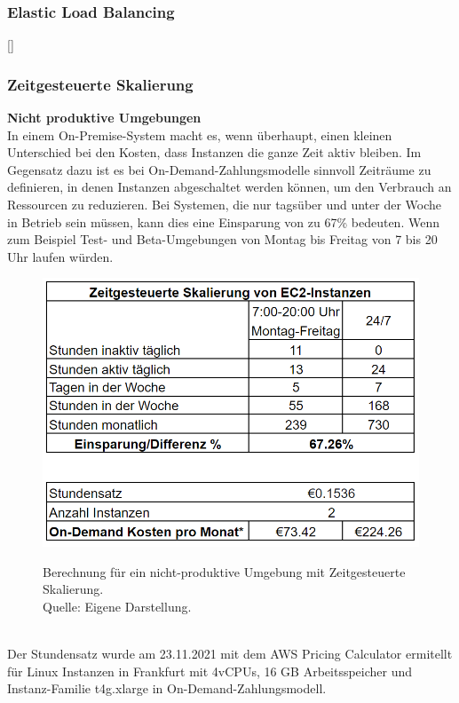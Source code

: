 \subsubsection*{Elastic Load Balancing}%
[]
\subsubsection{Zeitgesteuerte Skalierung}
\textbf{Nicht produktive Umgebungen}\\
In einem On-Premise-System macht es, wenn überhaupt, einen kleinen Unterschied bei den Kosten, dass Instanzen die ganze Zeit aktiv bleiben. Im Gegensatz dazu ist es bei On-Demand-Zahlungsmodelle sinnvoll Zeiträume zu definieren, in denen Instanzen abgeschaltet werden können, um den Verbrauch an Ressourcen zu reduzieren. Bei Systemen, die nur tagsüber und unter der Woche in Betrieb sein müssen, kann dies eine Einsparung von zu 67\% bedeuten.  Wenn zum Beispiel Test- und Beta-Umgebungen von Montag bis Freitag von 7 bis 20 Uhr laufen würden.
\begin{figure}[h]
  \centering
  \includegraphics[scale=0.6]{sources/Einsparung_Zeitgesteuerte_Skalierung}
  \caption[Berechnung für ein nicht produktives Umgebung mit Zeitgesteuerte Skalierung]{}
  \label{fig:Einsparung_Zeitgesteuerte_Skalierung} Berechnung für ein nicht-produktive Umgebung mit Zeitgesteuerte Skalierung. \\
  Quelle: Eigene Darstellung. 
\end{figure}
\\
Der Stundensatz wurde am 23.11.2021 mit dem AWS Pricing Calculator\cite{AMZ17} ermitellt für Linux Instanzen in Frankfurt mit 4vCPUs, 16 GB Arbeitsspeicher und Instanz-Familie t4g.xlarge in On-Demand-Zahlungsmodell.
